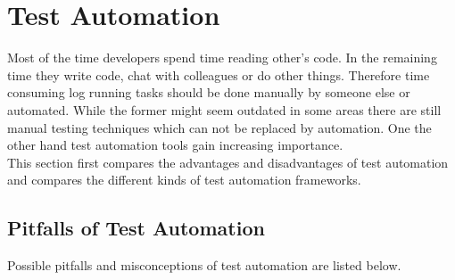 \documentclass[12pt, notitlepage]{article}
\begin{document}
\section{Test Automation}
Most of the time developers spend time reading other's code. In the remaining time they write code, chat with colleagues or do other things.
Therefore time consuming log running tasks should be done manually by someone else or automated.
While the former might seem outdated in some areas there are still manual testing techniques which can not be replaced by automation.
One the other hand test automation tools gain increasing importance.\\
This section first compares the advantages and disadvantages of test automation and compares the different kinds of test automation frameworks.
\subsection{Pitfalls of Test Automation}
Possible pitfalls and misconceptions of test automation are listed below\cite{test-automation-success}.
\end{document}
